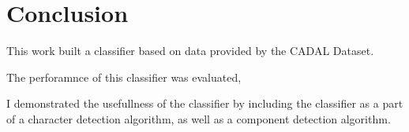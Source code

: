 \chapter{Conclusion}

This work built a classifier based on data provided by the CADAL Dataset.

The perforamnce of this classifier was evaluated,

I demonstrated the usefullness of the classifier by including the classifier as a part of a character detection algorithm, as well as a component detection algorithm.
